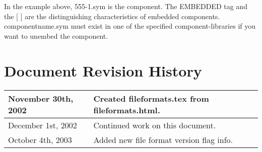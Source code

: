 \documentclass{article}
\begin{document}
In the example above, 555-1.sym is the component.  The EMBEDDED tag and
the [ ] are the distinguishing characteristics of embedded components.
componentname.sym must exist in one of the specified component-libraries
if you want to unembed the component.


\newpage
\section{Document Revision History}

\begin{table}[h]
\begin{tabular}{|l|l|} \hline
November 30th, 2002 & Created fileformats.tex from fileformats.html. \\ \hline
December 1st, 2002 & Continued work on this document. \\ \hline
October 4th, 2003 & Added new file format version flag info. \\ \hline
\end{tabular}
\end{table}
\end{document}
